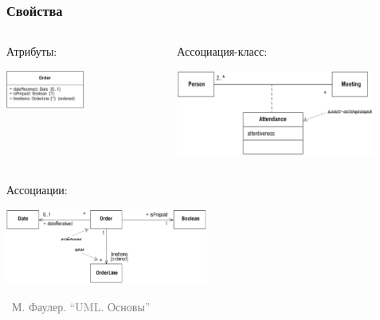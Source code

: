 \documentclass[xetex,mathserif,serif]{beamer}
\newcommand{\attribution}[1] {
	\vspace{-5mm}\begin{flushright}\begin{scriptsize}\textcolor{gray}{\textcopyright\, #1}\end{scriptsize}\end{flushright}
}
\begin{document}
	\begin{frame}
		\frametitle{Свойства}
		\begin{columns}
			\begin{column}{0.5\textwidth}
				Атрибуты:
				\begin{center}
					\includegraphics[width=0.5\textwidth]{attributes.png}
				\end{center}
			\end{column}
			\begin{column}{0.5\textwidth}
				Ассоциация-класс:
				\begin{center}
					\includegraphics[width=0.85\textwidth]{classAssociation.png}
				\end{center}
			\end{column}
		\end{columns}
		\vspace{5mm}
		Ассоциации:
		\begin{center}
			\includegraphics[width=0.5\textwidth]{associations.png}
		\end{center}
		\attribution{М. Фаулер. ``UML. Основы''}
	\end{frame}
\end{document}
